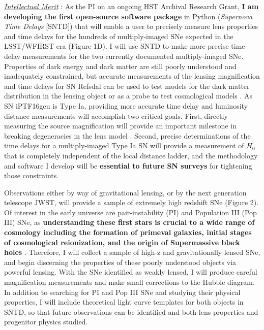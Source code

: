 \noindent\underline{\textit{Intellectual Merit}} :
As the PI on an ongoing HST Archival Research Grant, \textbf{I am
developing the first open-source software package} in Python
(\textit{Supernova Time Delays} [SNTD]) that will enable a user to
precisely measure lens properties and time delays for the hundreds of
multiply-imaged SNe expected in the LSST/WFIRST era (Figure 1D). I
will use SNTD to make more precise time delay measurements for the two
currently documented multiply-imaged SNe. Properties of dark energy
and dark matter are still poorly understood and inadequately
constrained, but accurate measurements of the lensing magnification and
time delays for SN Refsdal can be used to test models for the dark
matter distribution in the lensing
object \cite{Rodney:2015a,Rodney:2016} or as a probe to test
cosmological models \cite{Suyu:2014}. As SN iPTF16geu is Type Ia,
providing more accurate time delay and luminosity distance
measurements will accomplish two critical goals. First, directly
measuring the source magnification will provide an important milestone
in breaking degeneracies in the lens
model \cite{Kolatt:1998,Oguri:2003b}. Second, precise determinations
of the time delays for a multiply-imaged Type Ia SN will provide a
measurement of $H_0$ that is completely independent of the local
distance ladder, and the methodology and software I develop will
be \textbf{essential to future SN surveys} for tightening those
constraints.

Observations either by way of gravitational lensing, or by the next
generation telescope JWST, will provide a sample of extremely high
redshift SNe (Figure 2). Of interest in the early universe are
pair-instability (PI) and Population III (Pop III) SNe,
as \textbf{understanding these first stars is crucial to a wide range
of cosmology including the formation of primeval galaxies, initial
stages of cosmological reionization, and the origin of Supermassive
black holes} \cite{Whalen:2013}. Therefore, I will collect a sample
of high-z and gravitationally lensed SNe, and begin discerning
the properties of these poorly understood objects via powerful
lensing. With the SNe identified as weakly lensed, I will produce
careful magnification measurements and make small corrections
to the Hubble diagram. In addition to searching for PI and Pop III SNe
and studying their physical properties, I will include theoretical
light curve templates for both objects in SNTD, so that future
observations can be identified and both lens properties and progenitor
physics studied.


